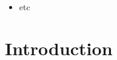 \documentclass[authoryear,preprint,review]{elsarticle}
\begin{document}
\begin{itemize}
\item etc
\end{itemize}

\section{Introduction}

\end{document}

